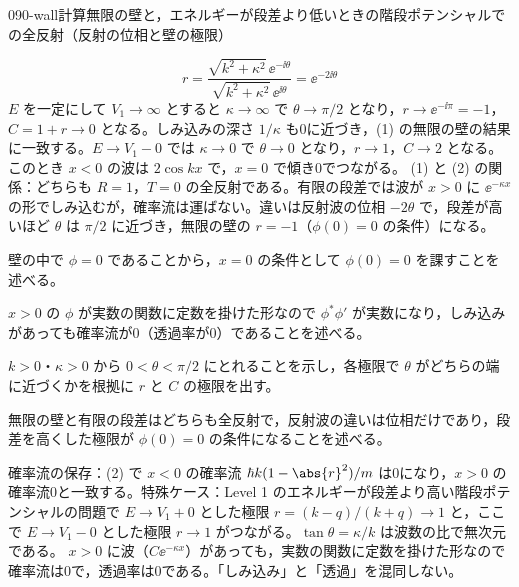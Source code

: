 \documentclass[uplatex,dvipdfmx,a4paper,11pt]{jsarticle}
\begin{document}
\begin{mondai}{090-wall}{計算}{無限の壁と，エネルギーが段差より低いときの階段ポテンシャルでの全反射（反射の位相と壁の極限）}
\begin{tadashii}
\[ r=\frac{\sqrt{k^{2}+\kappa^{2}}\,\ee^{-\ii\theta}}{\sqrt{k^{2}+\kappa^{2}}\,\ee^{\ii\theta}}=\ee^{-2\ii\theta} \]
$E$ を一定にして $V_{1}\to\infty$ とすると $\kappa\to\infty$ で $\theta\to\pi/2$ となり，$r\to\ee^{-\ii\pi}=-1$，$C=1+r\to 0$ となる。しみ込みの深さ $1/\kappa$ も0に近づき，(1) の無限の壁の結果に一致する。$E\to V_{1}-0$ では $\kappa\to 0$ で $\theta\to 0$ となり，$r\to 1$，$C\to 2$ となる。このとき $x<0$ の波は $2\cos kx$ で，$x=0$ で傾き0でつながる。
(1) と (2) の関係：どちらも $R=1$，$T=0$ の全反射である。有限の段差では波が $x>0$ に $\ee^{-\kappa x}$ の形でしみ込むが，確率流は運ばない。違いは反射波の位相 $-2\theta$ で，段差が高いほど $\theta$ は $\pi/2$ に近づき，無限の壁の $r=-1$（$\phi(0)=0$ の条件）になる。
\begin{ronten}
  \item {} 壁の中で $\phi=0$ であることから，$x=0$ の条件として $\phi(0)=0$ を課すことを述べる。
  \item {} $x>0$ の $\phi$ が実数の関数に定数を掛けた形なので $\phi^{*}\phi'$ が実数になり，しみ込みがあっても確率流が0（透過率が0）であることを述べる。
  \item {} $k>0$・$\kappa>0$ から $0<\theta<\pi/2$ にとれることを示し，各極限で $\theta$ がどちらの端に近づくかを根拠に $r$ と $C$ の極限を出す。
  \item {} 無限の壁と有限の段差はどちらも全反射で，反射波の違いは位相だけであり，段差を高くした極限が $\phi(0)=0$ の条件になることを述べる。
\end{ronten}
\kenzan 確率流の保存：(2) で $x<0$ の確率流 $\hbar k(1-\abs{r}^{2})/m$ は0になり，$x>0$ の確率流0と一致する。特殊ケース：Level 1 のエネルギーが段差より高い階段ポテンシャルの問題で $E\to V_{1}+0$ とした極限 $r=(k-q)/(k+q)\to 1$ と，ここで $E\to V_{1}-0$ とした極限 $r\to 1$ がつながる。$\tan\theta=\kappa/k$ は波数の比で無次元である。
\tsumazuki $x>0$ に波（$C\ee^{-\kappa x}$）があっても，実数の関数に定数を掛けた形なので確率流は0で，透過率は0である。「しみ込み」と「透過」を混同しない。
\end{tadashii}
\end{mondai}
\end{document}
